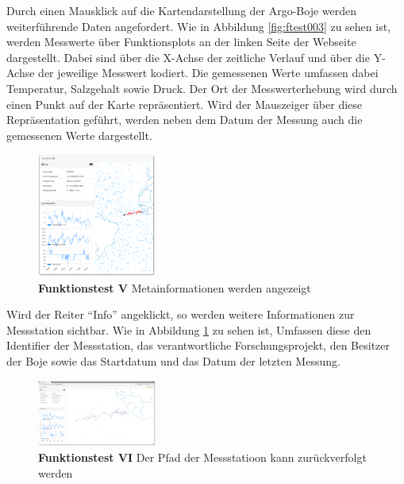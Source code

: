 Durch einen Mausklick auf die Kartendarstellung der Argo-Boje werden weiterführende Daten angefordert. Wie in Abbildung \ref{fig:ftest003} zu sehen ist, werden  Messwerte  über Funktionsplots an der linken Seite der Webseite dargestellt. Dabei sind über die X-Achse der zeitliche Verlauf und über die Y-Achse der jeweilige Messwert kodiert. Die gemessenen Werte umfassen dabei Temperatur, Salzgehalt sowie Druck.  Der Ort der Messwerterhebung wird durch einen Punkt auf der Karte repräsentiert. Wird der Mauszeiger über diese Repräsentation geführt, werden neben dem Datum der Messung auch die gemessenen Werte dargestellt.

\newpage

\begin{figure}
 \centering
 \includegraphics[width=0.35\textwidth]{pix/ftest/003b.png}

 \caption{\textbf{Funktionstest V} Metainformationen werden angezeigt}
 \label{fig:ftest003b}
\end{figure}

Wird der Reiter "`Info"' angeklickt, so werden weitere Informationen zur Messstation sichtbar. Wie in Abbildung \ref{fig:ftest003b} zu sehen ist,  Umfassen diese den Identifier der Messstation, das verantwortliche Forschungsprojekt, den Besitzer der Boje sowie das Startdatum und das Datum der letzten Messung.
\newline\newline\newline\newline
\newline\newline\newline


\begin{figure}
 \centering
 \includegraphics[width=0.35\textwidth]{pix/ftest/004.png}

 \caption{\textbf{Funktionstest VI} Der Pfad der Messstatioon kann zurückverfolgt werden}
 \label{fig:ftest004}
\end{figure}


